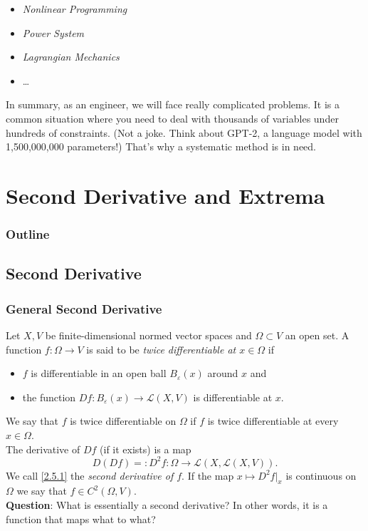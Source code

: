 \documentclass[11pt, t]{beamer}
\renewcommand{\emph}[1]{{\color{Turquoise3}\textsl{#1}}}
\newcommand{\nullspace}{~\\[15pt]}
\begin{document}
\begin{frame}[allowframebreaks]
\begin{itemize}
        \item \emph{Nonlinear Programming}
        \item \emph{Power System}
        \item \emph{Lagrangian Mechanics}
        \item \dots
    \end{itemize}
    In summary, as an engineer, we will face really complicated problems. It is a common situation where you need to deal with thousands of variables under hundreds of constraints. (Not a joke. Think about GPT-2, a language model with 1,500,000,000 parameters!) That's why a systematic method is in need.
\end{frame}

\section{Second Derivative and Extrema}
\begin{frame}
    \frametitle{Outline}
    \begin{spacing}{2.5}
        \tableofcontents[currentsubsection,hideothersubsections,sectionstyle=hide]
    \end{spacing}
\end{frame}

\subsection{Second Derivative}
\begin{frame}
    \frametitle{General Second Derivative}
    Let $X,V$ be finite-dimensional normed vector spaces and $\Omega\subset V$ an open set. A function $f:\Omega\to V$ is said to be \emph{twice dif{}ferentiable at $x\in\Omega$} if
    \begin{itemize}
        \item $f$ is dif{}ferentiable in an open ball $B_{\varepsilon}(x)$ around $x$ and
        \item the function $Df:B_\varepsilon(x)\to\mathcal{L}(X,V)$ is dif{}ferentiable at $x$.
    \end{itemize}
    We say that $f$ is twice dif{}ferentiable on $\Omega$ if $f$ is twice dif{}ferentiable at every $x\in\Omega$.\\[5pt]
    The derivative of $Df$ (if it exists) is a map
    \setcounter{equation}{0}
    \begin{equation}\label{2.5.1}
        D(Df)=:D^2f:\Omega\to\mathcal{L}(X,\mathcal{L}
        (X,V)).
    \end{equation}
    We call \eqref{2.5.1} the \emph{second derivative of $f$}. If the map $x\mapsto D^2f|_x$ is continuous on $\Omega$ we say that $f\in C^2(\Omega,V)$.
    \nullspace
    \textbf{Question}: What is essentially a second derivative? In other words, it is a function that maps what to what?
\end{frame}
\end{document}
